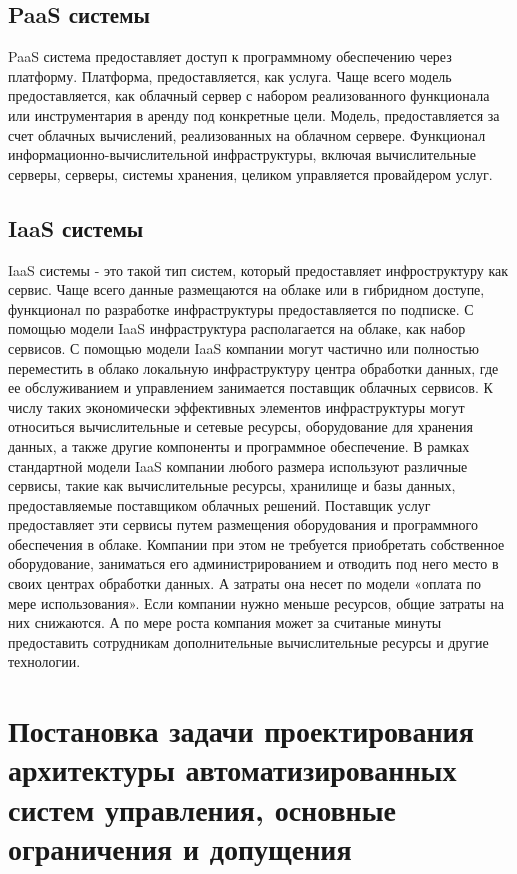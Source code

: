\subsection{PaaS системы}\label{sec:ch2/sec1/sub9}
PaaS система предоставляет доступ к программному обеспечению через платформу. Платформа, предоставляется, как услуга. Чаще всего модель предоставляется, как облачный сервер с набором реализованного функционала или инструментария в аренду под конкретные цели. Модель, предоставляется за счет облачных вычислений, реализованных на облачном сервере. Функционал информационно-вычислительной инфраструктуры, включая вычислительные серверы, серверы, системы хранения, целиком управляется провайдером услуг. 


\subsection{IaaS системы}\label{sec:ch2/sec1/sub10}
IaaS системы - это такой тип систем, который предоставляет инфроструктуру как сервис. Чаще всего данные размещаются на облаке или в гибридном доступе, функционал по разработке инфраструктуры предоставляется по подписке. С помощью модели IaaS инфраструктура располагается на облаке, как набор сервисов.
С помощью модели IaaS компании могут частично или полностью переместить в облако локальную инфраструктуру центра обработки данных, где ее обслуживанием и управлением занимается поставщик облачных сервисов. К числу таких экономически эффективных элементов инфраструктуры могут относиться вычислительные и сетевые ресурсы, оборудование для хранения данных, а также другие компоненты и программное обеспечение. 
В рамках стандартной модели IaaS компании любого размера используют различные сервисы, такие как вычислительные ресурсы, хранилище и базы данных, предоставляемые поставщиком облачных решений. Поставщик услуг предоставляет эти сервисы путем размещения оборудования и программного обеспечения в облаке. Компании при этом не требуется приобретать собственное оборудование, заниматься его администрированием и отводить под него место в своих центрах обработки данных. А затраты она несет по модели «оплата по мере использования». Если компании нужно меньше ресурсов, общие затраты на них снижаются. А по мере роста компания может за считаные минуты предоставить сотрудникам дополнительные вычислительные ресурсы и другие технологии.
\section{Постановка задачи проектирования архитектуры автоматизированных систем управления, основные ограничения и допущения}\label{sec:ch2/sec2}

